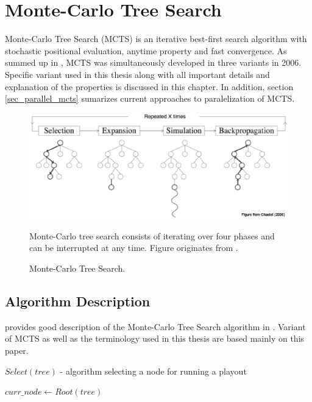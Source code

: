 \chapter{Monte-Carlo Tree Search}
\label{chap_mcts}

Monte-Carlo Tree Search (MCTS) is an iterative best-first search algorithm with stochastic positional
evaluation, anytime property and fast convergence. As \citeauthor{ChaslotPhd2010} summed up in 
\cite{ChaslotPhd2010}, MCTS was simultaneously developed
in three variants \cites{Chaslot2006}{Coulom2006}{Kocsis2006} in 2006. Specific variant used in
this thesis along with all important details and explanation of the properties is discussed in this
chapter. In addition, section \ref{sec_parallel_mcts} sumarizes current approaches to paralelization
of MCTS.

\begin{figure}
\begin{center}
\includegraphics[width=14cm]{img/mcts-algorithm-1a.eps}
\end{center}
\caption{\footnotesize Monte-Carlo Tree Search.}{\footnotesize Monte-Carlo tree search consists
of iterating over four phases and can be interrupted at any time. Figure originates from
\cite{ChaslotPhd2010}.}
\label{fig_mcts_loop}
\end{figure}



\section{Algorithm Description}
\label{sec_mcts_description}

\citeauthor{Chaslot2008} provides good description of the Monte-Carlo Tree Search algorithm in
\cite{Chaslot2008}. Variant of MCTS as well as the terminology used in this thesis are based mainly
on this paper.


\begin{algorithm}
\DontPrintSemicolon
\caption{$Select(tree)$ - algorithm selecting a node for running a playout
    \label{alg_select}}
$curr\_node \leftarrow Root(tree)$\;
\;
\end{algorithm}


